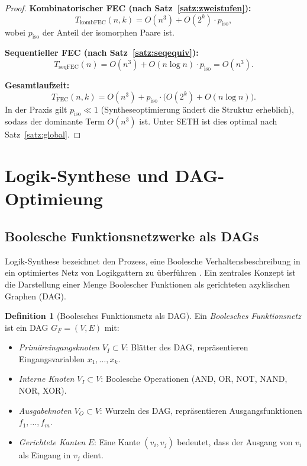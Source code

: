 ﻿\documentclass[a4paper,12pt]{article}
\theoremstyle{definition}
\newtheorem{definition}{Definition}
\begin{document}
\begin{proof}
  \textbf{Kombinatorischer FEC (nach Satz~\ref{satz:zweistufen}):}
  \[
    T_{\text{kombFEC}}(n, k) = O(n^3) + O(2^k) \cdot p_{\text{iso}},
  \]
  wobei $p_{\text{iso}}$ der Anteil der isomorphen Paare ist.

  \textbf{Sequentieller FEC (nach Satz~\ref{satz:seqequiv}):}
  \[
    T_{\text{seqFEC}}(n) = O(n^3) + O(n \log n) \cdot p_{\text{iso}} = O(n^3).
  \]

  \textbf{Gesamtlaufzeit:}
  \[
    T_{\text{FEC}}(n, k) = O(n^3) + p_{\text{iso}} \cdot \bigl(O(2^k) + O(n \log n)\bigr).
  \]
  In der Praxis gilt $p_{\text{iso}} \ll 1$ (Syntheseoptimierung ändert die Struktur
  erheblich), sodass der dominante Term $O(n^3)$ ist. Unter SETH ist dies optimal nach
  Satz~\ref{satz:global}.
\end{proof}

\section{Logik-Synthese und DAG-Optimieung}

\subsection{Boolesche Funktionsnetzwerke als DAGs}

Logik-Synthese bezeichnet den Prozess, eine Boolesche Verhaltensbeschreibung in ein
optimiertes Netz von Logikgattern zu überführen \cite[Kap.~6]{ciletti2011}. Ein zentrales
Konzept ist die Darstellung einer Menge Boolescher Funktionen als gerichteten azyklischen
Graphen (DAG).

\begin{definition}[Boolesches Funktionsnetz als DAG]
  Ein \emph{Boolesches Funktionsnetz} ist ein DAG $G_F = (V, E)$ mit:
  \begin{itemize}
    \item \emph{Primäreingangsknoten} $V_I \subset V$: Blätter des DAG, repräsentieren
          Eingangsvariablen $x_1, \ldots, x_k$.
    \item \emph{Interne Knoten} $V_I \subset V$: Boolesche Operationen
          (AND, OR, NOT, NAND, NOR, XOR).
    \item \emph{Ausgabeknoten} $V_O \subset V$: Wurzeln des DAG, repräsentieren
          Ausgangsfunktionen $f_1, \ldots, f_m$.
    \item \emph{Gerichtete Kanten} $E$: Eine Kante $(v_i, v_j)$ bedeutet, dass der
          Ausgang von $v_i$ als Eingang in $v_j$ dient.
  \end{itemize}
\end{definition}
\end{document}
